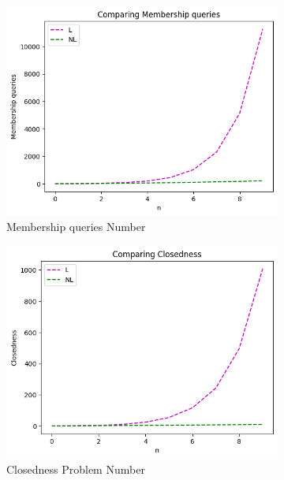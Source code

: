 \begin{figure}[!htb]
  \begin{subfigure}[b]{0.3\textwidth}
    \includegraphics[width=\textwidth]{../statistics/plots/wrostDFA/Membership queries.png}
    \caption{Membership queries Number}
    \label{fig:MemberWrostDFACompare}
  \end{subfigure}
  \begin{subfigure}[b]{0.3\textwidth}
    \includegraphics[width=\textwidth]{../statistics/plots/wrostDFA/Closedness.png}
    \caption{Closedness Problem Number}
    \label{fig:ClosednessWrostDFACompare}
  \end{subfigure}
  \begin{subfigure}[b]{0.3\textwidth}

\end{subfigure}
\end{figure}
